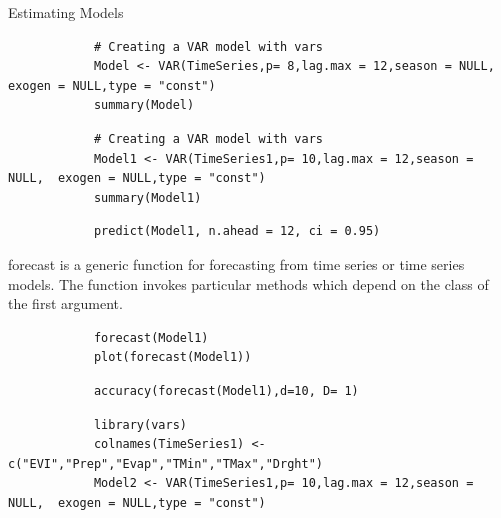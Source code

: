 \documentclass[12pt,a4paper]{book}
\begin{document}
			 Estimating Models
			 
				\begin{shaded}
				\begin{verbatim}
			# Creating a VAR model with vars
			Model <- VAR(TimeSeries,p= 8,lag.max = 12,season = NULL,  exogen = NULL,type = "const")
			summary(Model)
				\end{verbatim}
		\end{shaded}
	
				\begin{shaded}
				\begin{verbatim}
			# Creating a VAR model with vars
			Model1 <- VAR(TimeSeries1,p= 10,lag.max = 12,season = NULL,  exogen = NULL,type = "const")
			summary(Model1)
				\end{verbatim}
		\end{shaded}
	
				\begin{shaded}
				\begin{verbatim}
			predict(Model1, n.ahead = 12, ci = 0.95)
				\end{verbatim}
		\end{shaded}
			forecast is a generic function for forecasting from time series or time series models. The function invokes particular methods which depend on the class of the first argument.
			\begin{shaded}
				\begin{verbatim}
			forecast(Model1)
			plot(forecast(Model1))
				\end{verbatim}
		     \end{shaded}
	
				\begin{shaded}
				\begin{verbatim}
			accuracy(forecast(Model1),d=10, D= 1)
				\end{verbatim}
		      \end{shaded}
	
				\begin{shaded}
				\begin{verbatim}
			library(vars)
			colnames(TimeSeries1) <-c("EVI","Prep","Evap","TMin","TMax","Drght")
			Model2 <- VAR(TimeSeries1,p= 10,lag.max = 12,season = NULL,  exogen = NULL,type = "const")
				\end{verbatim}
		\end{shaded}
		
\end{document}
